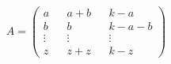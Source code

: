 \documentclass{article} %
\begin{document}
\[
A = \left( \begin{array}{lcccl}
a & & a+b & & k-a \\
b & & b & & k-a-b \\
\vdots & & \vdots & & \vdots \\
z & & z + z & & k-z
\end{array}
\right)
\]
\end{document}
